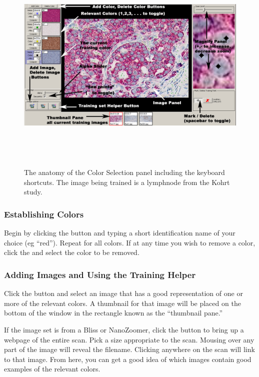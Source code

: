 \documentclass[12pt]{article}
\begin{document}
\begin{figure}[htp]
\centering
\includegraphics[width=476pt,height=281pt]{colorselection.jpg}
\label{fig:colorselection}
\caption{\sf The anatomy of the Color Selection panel including the keyboard shortcuts. The image being trained is a lymphnode from the Kohrt study\cite{kohrt}.}
\end{figure}

\subsubsection{Establishing Colors}

Begin by clicking the  button and typing a short identification name
of your choice (eg ``red''). Repeat for all colors. If at any time you wish to remove a color, click the  and select the color to be removed. 

\subsubsection{Adding Images and Using the Training Helper}

Click the  button and select an image that has a good representation of one or more of the relevant colors. A thumbnail for that image will be placed on the bottom of the window in the rectangle known as the ``thumbnail pane.''

If the image set is from a Bliss or NanoZoomer, click the  button to bring up a webpage of the entire scan. Pick a size appropriate to the scan. Mousing over any part of the image will reveal the filename. Clicking anywhere on the scan will link to that image. From here, you can get a good idea of which images contain good examples of the relevant colors.
\end{document}
